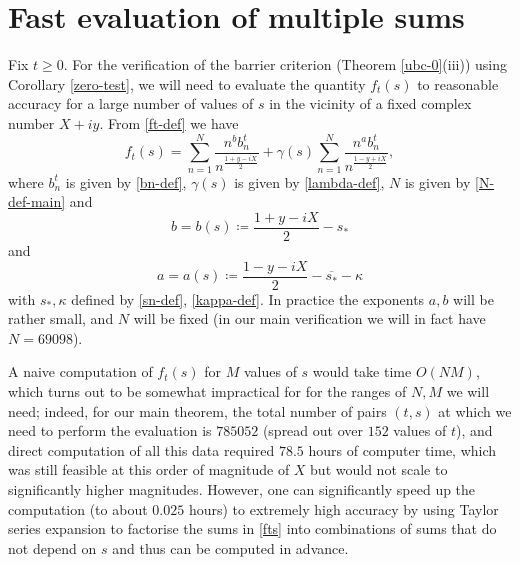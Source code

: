 \section{Fast evaluation of multiple sums}\label{multiple-sec}

Fix $t \geq 0$.  For the verification of the barrier criterion (Theorem \ref{ubc-0}(iii)) using Corollary \ref{zero-test}, we will need to evaluate the quantity $f_t(s)$ to reasonable accuracy for a large number of values of $s$ in the vicinity of a fixed complex number $X+iy$.  From \eqref{ft-def} we have
\begin{equation}\label{fts}
f_t(s) = \sum_{n=1}^N \frac{n^b b_n^t}{n^{\frac{1+y-iX}{2}}} + \gamma(s) \sum_{n=1}^N \frac{n^a b_n^t}{n^{\frac{1-y+iX}{2}}},
\end{equation}
where $b_n^t$ is given by \eqref{bn-def}, $\gamma(s)$ is given by \eqref{lambda-def}, $N$ is given by \eqref{N-def-main} and
$$ b = b(s) \coloneqq  \frac{1+y-iX}{2} - s_* $$
and
$$ a = a(s) \coloneqq  \frac{1-y-iX}{2} - \overline{s_*} - \kappa$$
with $s_*, \kappa$ defined by \eqref{sn-def}, \eqref{kappa-def}.  In practice the exponents $a,b$ will be rather small, and $N$ will be fixed (in our main verification we will in fact have $N = 69098$).

A naive computation of $f_t(s)$ for $M$ values of $s$ would take time $O(NM)$, which turns out to be somewhat impractical for for the ranges of $N,M$ we will need; indeed, for our main theorem, the total number of pairs $(t,s)$ at which we need to perform the evaluation is $785052$ (spread out over $152$ values of $t$), and direct computation of all this data required $78.5$ hours of computer time, which was still feasible at this order of magnitude of $X$ but would not scale to significantly higher magnitudes.  However, one can significantly speed up the computation (to about $0.025$ hours) to extremely high accuracy by using Taylor series expansion to factorise the sums in \eqref{fts} into combinations of sums that do not depend on $s$ and thus can be computed in advance.

